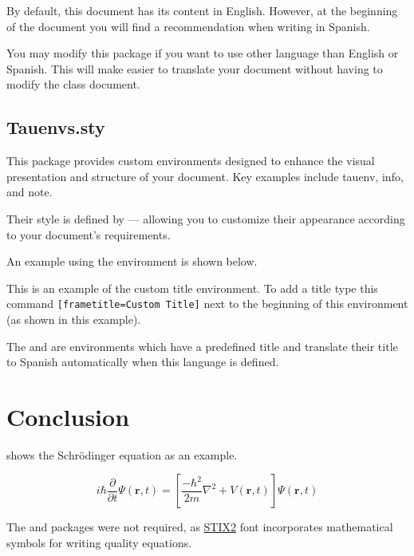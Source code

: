 \documentclass[9pt,a4paper,twocolumn,twoside]{tau-class/tau}
\begin{document}
		By default, this document has its content in English. However, at the beginning of the document you will find a recommendation when writing in Spanish. 
		
		You may modify this package if you want to use other language than English or Spanish. This will make easier to translate your document without having to modify the class document.

	\subsection{Tauenvs.sty}

        This package provides custom environments designed to enhance the visual presentation and structure of your document. Key examples include tauenv, info, and note.
        
		Their style is defined by  — allowing you to customize their appearance according to your document’s requirements.

		An example using the  environment is shown below.
		
		\begin{tauenv}[frametitle=Custom Title]
			This is an example of the custom title environment. To add a title type this command \verb|[frametitle=Custom Title]| next to the beginning of this environment (as shown in this example).
		\end{tauenv}

        The  and  are environments which have a predefined title and translate their title to Spanish automatically when this language is defined.

\section{Conclusion}

	 shows the Schrödinger equation as an example. 

    \begin{equation}\label{eq:equation}
        i\hbar \frac{\partial }{\partial t}\Psi(\mathbf{r},t) = \left[\frac{-\hbar^2}{2m}\nabla^2 + V(\mathbf{r},t) \right]\Psi(\mathbf{r},t)
    \end{equation}
	
	The  and  packages were not required, as \href{https://ctan.org/pkg/stix2-otf/}{STIX2} font incorporates mathematical symbols for writing quality equations.
	
\end{document}
